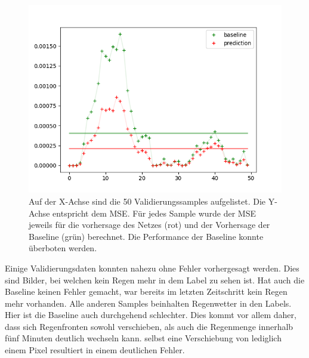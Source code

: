 \begin{figure}[h]
	\centering
	\includegraphics[width=\linewidth]{pics/mse_baseline.png}
	\caption[Vergleich zwischen Baseline und Netzvorhersage.]{Auf der X-Achse sind die 50 Validierungssamples aufgelistet. Die Y-Achse entspricht dem MSE. Für jedes Sample wurde der MSE jeweils für die vorhersage des Netzes (rot) und der Vorhersage der Baseline (grün) berechnet. Die Performance der Baseline konnte überboten werden.}
	\label{vglBaseline1}
\end{figure}

Einige Validierungsdaten konnten nahezu ohne Fehler vorhergesagt werden. Dies sind Bilder, bei welchen kein Regen mehr in dem Label zu sehen ist. Hat auch die Baseline keinen Fehler gemacht, war bereits im letzten Zeitschritt kein Regen mehr vorhanden. Alle anderen Samples beinhalten Regenwetter in den Labels. Hier ist die Baseline auch durchgehend schlechter. Dies kommt vor allem daher, dass sich Regenfronten sowohl verschieben, als auch die Regenmenge innerhalb fünf Minuten deutlich wechseln kann. selbst eine Verschiebung von lediglich einem Pixel resultiert in einem deutlichen Fehler.

